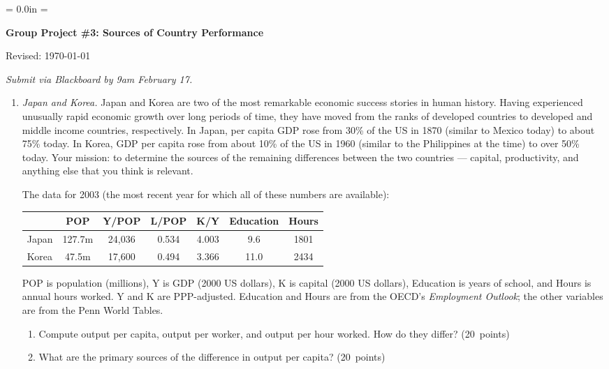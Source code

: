 \documentclass[letterpaper,12pt]{article}
\def\HeadName{Group Project \#3}
\begin{document}
\parindent = 0.0in
\parskip = \bigskipamount
\thispagestyle{empty}%
\Head

\centerline{\large \bf \HeadName:  Sources of Country Performance}%
\centerline{Revised:  \today}

\medskip
{\it Submit via Blackboard by 9am February 17.}

\begin{enumerate}

\item {\it Japan and Korea. }   
Japan and Korea are two of the most remarkable economic 
success stories in human history.
Having experienced unusually rapid economic growth over long periods of time, they have moved from the ranks of developed countries to 
developed and middle income countries, respectively.  
In Japan, per capita GDP rose from 30\% of the US in 1870 
(similar to Mexico today) to about 75\% today.  
In Korea, GDP per capita rose from about 10\% of the US in 1960 
(similar to the Philippines at the time) 
to over 50\% today.
Your mission:  to determine the sources of the remaining differences
between the two countries --- capital, productivity, and anything else 
that you think is relevant.  

The data for 2003 
(the most recent year for which all of these numbers are available):
\begin{center}
\begin{tabular}{lcccccc}
\hline\hline
        &  POP  &  Y/POP  &  L/POP  &  K/Y     &  Education &  Hours \\
\hline\hline
Japan   & 127.7m &  24,036 &  0.534 & 4.003     & \phantom{1}9.6 & 1801 \\%
Korea   &  \phantom{1}47.5m 
                 &  17,600 &  0.494 & 3.366    & 11.0  &  2434  \\%
\hline\hline
\end{tabular}
\end{center}
POP is population (millions), Y is GDP (2000 US dollars), 
K is capital (2000 US dollars), Education is years of school, 
and Hours is annual hours worked.  
Y and K are PPP-adjusted.  
Education and Hours are from the OECD's {\it Employment Outlook\/};
the other variables are from the Penn World Tables.  

\begin{enumerate}
\item Compute output per capita, output per worker, and output per
hour worked.  How do they differ? (20~points)

\item What are the primary sources of the difference in output per
capita? (20~points)


\end{enumerate}
\end{enumerate}
\end{document}
